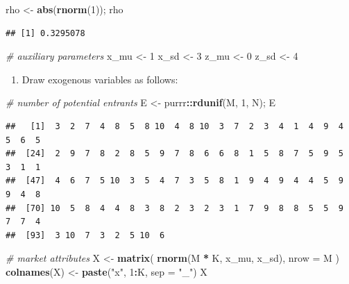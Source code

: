 \documentclass[]{book}
\newenvironment{Shaded}{\begin{snugshade}}{\end{snugshade}}
\newcommand{\KeywordTok}[1]{\textcolor[rgb]{0.13,0.29,0.53}{\textbf{#1}}}
\newcommand{\DataTypeTok}[1]{\textcolor[rgb]{0.13,0.29,0.53}{#1}}
\newcommand{\DecValTok}[1]{\textcolor[rgb]{0.00,0.00,0.81}{#1}}
\newcommand{\StringTok}[1]{\textcolor[rgb]{0.31,0.60,0.02}{#1}}
\newcommand{\CommentTok}[1]{\textcolor[rgb]{0.56,0.35,0.01}{\textit{#1}}}
\newcommand{\OperatorTok}[1]{\textcolor[rgb]{0.81,0.36,0.00}{\textbf{#1}}}
\newcommand{\NormalTok}[1]{#1}
\providecommand{\tightlist}{%
  \setlength{\itemsep}{0pt}\setlength{\parskip}{0pt}}
\begin{document}
\begin{Shaded}
\begin{Highlighting}[]
\NormalTok{rho <-}\StringTok{ }\KeywordTok{abs}\NormalTok{(}\KeywordTok{rnorm}\NormalTok{(}\DecValTok{1}\NormalTok{)); rho}
\end{Highlighting}
\end{Shaded}

\begin{verbatim}
## [1] 0.3295078
\end{verbatim}

\begin{Shaded}
\begin{Highlighting}[]
\CommentTok{# auxiliary parameters}
\NormalTok{x_mu <-}\StringTok{ }\DecValTok{1}
\NormalTok{x_sd <-}\StringTok{ }\DecValTok{3}
\NormalTok{z_mu <-}\StringTok{ }\DecValTok{0}
\NormalTok{z_sd <-}\StringTok{ }\DecValTok{4}
\end{Highlighting}
\end{Shaded}

\begin{enumerate}
\def\labelenumi{\arabic{enumi}.}
\setcounter{enumi}{2}
\tightlist
\item
  Draw exogenous variables as follows:
\end{enumerate}

\begin{Shaded}
\begin{Highlighting}[]
\CommentTok{# number of potential entrants}
\NormalTok{E <-}\StringTok{ }\NormalTok{purrr}\OperatorTok{::}\KeywordTok{rdunif}\NormalTok{(M, }\DecValTok{1}\NormalTok{, N); E}
\end{Highlighting}
\end{Shaded}

\begin{verbatim}
##   [1]  3  2  7  4  8  5  8 10  4  8 10  3  7  2  3  4  1  4  9  4  5  6  5
##  [24]  2  9  7  8  2  8  5  9  7  8  6  6  8  1  5  8  7  5  9  5  3  1  1
##  [47]  4  6  7  5 10  3  5  4  7  3  5  8  1  9  4  9  4  4  5  9  9  4  8
##  [70] 10  5  8  4  4  8  3  8  2  3  2  3  1  7  9  8  8  5  5  9  7  7  4
##  [93]  3 10  7  3  2  5 10  6
\end{verbatim}

\begin{Shaded}
\begin{Highlighting}[]
\CommentTok{# market attributes}
\NormalTok{X <-}\StringTok{ }\KeywordTok{matrix}\NormalTok{(}
  \KeywordTok{rnorm}\NormalTok{(M }\OperatorTok{*}\StringTok{ }\NormalTok{K, x_mu, x_sd),}
  \DataTypeTok{nrow =}\NormalTok{ M}
\NormalTok{)}
\KeywordTok{colnames}\NormalTok{(X) <-}\StringTok{ }\KeywordTok{paste}\NormalTok{(}\StringTok{"x"}\NormalTok{, }\DecValTok{1}\OperatorTok{:}\NormalTok{K, }\DataTypeTok{sep =} \StringTok{"_"}\NormalTok{)}
\NormalTok{X}
\end{Highlighting}
\end{Shaded}
\end{document}
